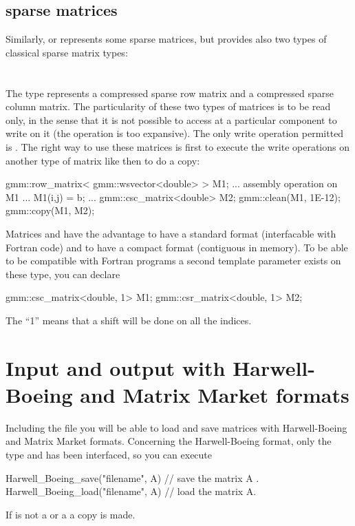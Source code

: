 \documentclass[11pt,a4paper]{article}
\begin{document}
\subsection{sparse matrices}
Similarly,  or  represents some sparse matrices, but \gmm provides also two types of classical sparse matrix types:  \\[0.2cm]
  \\
  \\[0.2cm]
The type  represents a compressed sparse row matrix and  a compressed sparse column matrix. The particularity of these two types of matrices is to be read only, in the sense that it is not possible to access at a particular component to write on it (the operation is too expansive). The only write operation permitted is . The right way to use these matrices is first to execute the write operations on another type of matrix like  then to do a copy:
\begin{cppcode}
  gmm::row_matrix< gmm::wsvector<double> > M1;
  ...
  assembly operation on M1
  ...
  M1(i,j) = b;
  ...
  gmm::csc_matrix<double> M2;
  gmm::clean(M1, 1E-12);
  gmm::copy(M1, M2);
\end{cppcode}
Matrices  and  have the advantage to have a standard format (interfacable with Fortran code) and to have a compact format (contiguous in memory). To be able to be compatible with Fortran programs a second template parameter exists on these type, you can declare
\begin{cppcode}
  gmm::csc_matrix<double, 1> M1;
  gmm::csr_matrix<double, 1> M2;
\end{cppcode}
The ``1'' means that a shift will be done on all the indices.

\section{Input and output with Harwell-Boeing and Matrix Market formats}
Including the file  you will be able to load and save matrices with Harwell-Boeing and Matrix Market formats. Concerning the Harwell-Boeing format, only the type  and  has been interfaced, so you can execute
\begin{cppcode}
Harwell_Boeing_save("filename", A) // save the matrix A .
Harwell_Boeing_load("filename", A) // load the matrix A.
\end{cppcode}
If  is not a   or a  a copy is made.\\
\end{document}
